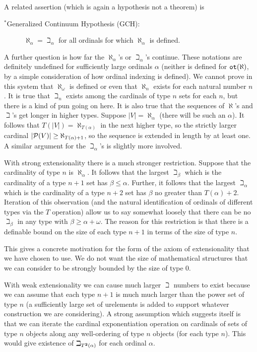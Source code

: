 \documentclass[12pt]{book}
\begin{document}
A related assertion (which is again a hypothesis not a theorem) is 

\begin{description}

\item[$^*$Generalized Continuum Hypothesis (GCH):] $\aleph_{\alpha} =
\beth_{\alpha}$ for all ordinals for which $\aleph_{\alpha}$ is
defined.

\end{description}

A further question is how far the $\aleph_{\alpha}$'s or
$\beth_{\alpha}$'s continue.  These notations are definitely undefined
for sufficiently large ordinals $\alpha$ (neither is defined for ${\tt
ot}(\aleph)$, by a simple consideration of how ordinal indexing is
defined).  We cannot prove in this system that $\aleph_{\omega}$ is
defined or even that $\aleph_n$ exists for each natural number $n$.
It is true that $\beth_n$ exists among the cardinals of type $n$ sets
for each $n$, but there is a kind of pun going on here.  It is also
true that the sequences of $\aleph$'s and $\beth$'s get longer in
higher types.  Suppose $|V| = \aleph_{\alpha}$ (there will be such an
$\alpha$).  It follows that $T(|V|) = \aleph_{T(\alpha)}$ in the next
higher type, so the strictly larger cardinal $|{\cal P}(V)| \geq \aleph_{T(\alpha)+1}$, so the
sequence is extended in length by at least one.  A similar argument for
the $\beth_{\alpha}$'s is slightly more involved.

With strong extensionality there is a much stronger restriction.
Suppose that the cardinality of type $n$ is $\aleph_{\alpha}$.  It
follows that the largest $\beth_{\beta}$ which is the cardinality of a
type $n+1$ set has $\beta\leq\alpha$.  Further, it follows that the
largest $\beth_{\alpha}$ which is the cardinality of a type $n+2$ set
has $\beta$ no greater than $T(\alpha)+2$.  Iteration of this
observation (and the natural identification of ordinals of different
types via the $T$ operation) allow us to say somewhat loosely that there
can be no $\beth_{\beta}$ in any type with $\beta \geq \alpha+\omega$.
The reason for this restriction is that there is a definable bound on
the size of each type $n+1$ in terms of the size of type $n$.

This gives a concrete motivation for the form of the axiom of
extensionality that we have chosen to use.  We do not want the size of
mathematical structures that we can consider to be strongly bounded by
the size of type 0.

With weak extensionality we can cause much larger $\beth$ numbers to
exist because we can assume that each type $n+1$ is much much larger
than the power set of type $n$ (a sufficiently large set of urelements
is added to support whatever construction we are considering). A
strong assumption which suggests itself is that we can iterate the
cardinal exponentiation operation on cardinals of sets of type $n$
objects along any well-ordering of type $n$ objects (for each type
$n$).  This would give existence of $\beth_{T^{\bf 2}(\alpha)}$ for
each ordinal $\alpha$.
\end{document}
